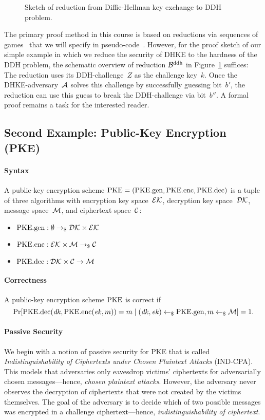\begin{figure}
    \centering
    
    \caption{Sketch of reduction from Diffie-Hellman key exchange to DDH problem.}
    \label{fig:dhke:reduction}
\end{figure}

The primary proof method in this course is based on reductions via sequences of games~\cite{EPRINT:Shoup04} that we will specify in pseudo-code~\cite{EC:BelRog06}.
However, for the proof sketch of our simple example in which we reduce the security of DHKE to the hardness of the DDH problem, the schematic overview of reduction $\mathcal{B}^{\mathrm{ddh}}$ in Figure~\ref{fig:dhke:reduction} suffices:
The reduction uses its DDH-challenge~$Z$ as the challenge key~$k$.
Once the DHKE-adversary~$\mathcal{A}$ solves this challenge by successfully guessing bit~$b'$, the reduction can use this guess to break the DDH-challenge via bit~$b''$.
A formal proof remains a task for the interested reader.

\subsection{Second Example: Public-Key Encryption (PKE)}
\label{sec:overview:pke}

\paragraph{Syntax}
A public-key encryption scheme $\mathrm{PKE}=(\mathrm{PKE}.\mathrm{gen},\mathrm{PKE}.\mathrm{enc},\mathrm{PKE}.\mathrm{dec})$ is a tuple of three algorithms with encryption key space~$\mathcal{EK}$, decryption key space~$\mathcal{DK}$, message space~$\mathcal{M}$, and ciphertext space~$\mathcal{C}$:

\begin{itemize}
    \item $\mathrm{PKE}.\mathrm{gen}: \emptyset \to_\$ \mathcal{DK}\times\mathcal{EK}$
    \item $\mathrm{PKE}.\mathrm{enc}: \mathcal{EK}\times\mathcal{M} \to_\$ \mathcal{C}$
    \item $\mathrm{PKE}.\mathrm{dec}: \mathcal{DK}\times\mathcal{C} \to \mathcal{M}$
\end{itemize}

\paragraph{Correctness}
A public-key encryption scheme $\mathrm{PKE}$ is correct if
\[
\Pr[\mathrm{PKE}.\mathrm{dec}(\mathit{dk},\mathrm{PKE}.\mathrm{enc}(\mathit{ek},m))=m\mid (\mathit{dk},\mathit{ek})\gets_\$\mathrm{PKE}.\mathrm{gen},m\gets_\$\mathcal{M}]=1\text{.}
\]

\paragraph{Passive Security}
We begin with a notion of passive security for PKE that is called \emph{Indistinguishability of Ciphertexts under Chosen Plaintext Attacks} (IND-CPA).
This models that adversaries only eavesdrop victims' ciphertexts for adversarially chosen messages---hence, \emph{chosen plaintext attacks}.
However, the adversary never observes the decryption of ciphertexts that were not created by the victims themselves.
The goal of the adversary is to decide which of two possible messages was encrypted in a challenge ciphertext---hence, \emph{indistinguishability of ciphertext}.

